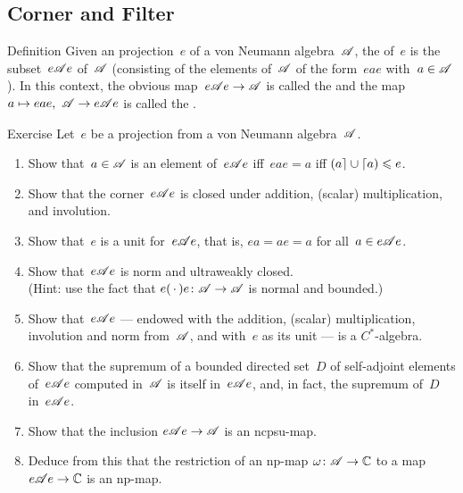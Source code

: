 \documentclass[a]{subfiles}
\begin{document}
\subsection{Corner and Filter}
\begin{parsec}%
\begin{point}{Definition}%
Given an projection~$e$ of a von Neumann algebra~$\mathscr{A}$,
the %
of~$e$
is the subset~$e\mathscr{A} e$%
of~$\mathscr{A}$ 
(consisting of the elements of~$\mathscr{A}$
of the form~$eae$ with~$a\in\mathscr{A}$).
In this context,
the obvious map~$e\mathscr{A} e\to\mathscr{A}$
is called the %
and the map $a\mapsto eae,\ \scrA\to e\scrA e$
is called the .%
\end{point}
\begin{point}{Exercise}%
Let~$e$ be a projection from a von Neumann algebra~$\mathscr{A}$.
\begin{enumerate}
\item
Show that~$a\in\mathscr{A}$ 
is an element of~$e\mathscr{A} e$ iff~$eae=a$
iff $\left(a\right\rceil\cup\left\lceil a\right) \leqslant e$.
\item
Show that the corner~$e\mathscr{A} e$
is closed under addition, (scalar) multiplication,
and involution.
\item
Show that~$e$ is a unit for~$e\mathscr{A} e$,
that is, $ea=ae=a$ for all~$a\in e\mathscr{A} e$.
\item
Show that~$e\mathscr{A} e$ is norm and ultraweakly closed.\\
(Hint: use the fact that $e(\,\cdot\,)e\colon \mathscr{A}\to\mathscr{A}$
is normal and bounded.)
\item
Show that~$e\mathscr{A} e$ --- 
endowed with the addition, (scalar) multiplication,
involution and norm from~$\mathscr{A}$,
and with~$e$ as its unit ---  is a $C^*$-algebra.
\item
Show that the supremum of a bounded directed
set~$D$ of self-adjoint elements of~$e\mathscr{A} e$
computed in~$\mathscr{A}$
is itself in~$e\mathscr{A} e$,
and, in fact, the supremum of~$D$ in~$e\mathscr{A} e$.
\item
Show that the inclusion $e\mathscr{A} e\to\mathscr{A}$
is an ncpsu-map.
\item
Deduce from this that the restriction of an np-map
$\omega\colon \mathscr{A}\to\mathbb{C}$ to
a map $e\mathscr{A} e\to\mathbb{C}$
is an np-map.


\end{enumerate}
\end{point}
\end{parsec}
\end{document}
